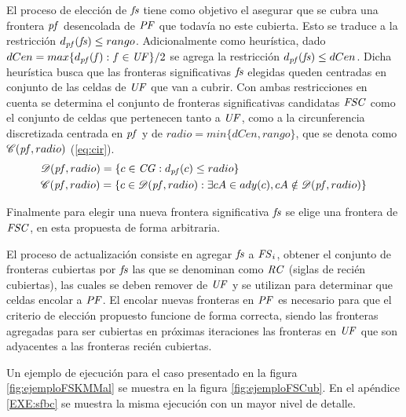 El proceso de elección de $\mathit{fs}$ tiene como objetivo el asegurar que se
cubra una frontera $\mathit{pf}$ desencolada de $\mathit{PF}$ que todavía no este
cubierta. Esto se traduce a la restricción $d_{\mathit{pf}}(\mathit{fs}) \leq rango$.
Adicionalmente como heurística, dado $dCen = max\{ d_{\mathit{pf}}(\mathit{f}) :
f\in\mathit{UF} \}/2$ se agrega la restricción $d_{\mathit{pf}}(\mathit{fs}) \leq dCen$.
Dicha heurística busca que las fronteras significativas $\mathit{fs}$ elegidas queden
centradas en conjunto de las celdas de $\mathit{UF}$ que van a cubrir. Con ambas
restricciones en cuenta se determina el conjunto de fronteras significativas
candidatas $\mathit{FSC}$ como el conjunto de celdas que pertenecen tanto a $\mathit{UF}$, como 
a la circunferencia discretizada centrada en $\mathit{pf}$ y de $radio = min
\{dCen, rango\}$, que se denota como $\mathscr{C}(\mathit{pf},radio)$
(\ref{eq:cir}).
\begin{equation} \label{eq:cir}
\begin{aligned}
&\mathscr{D}(\mathit{pf},radio) = \{c\in\mathit{CG} : d_{\mathit{pf}}(c) \leq radio\}\\ 
&\mathscr{C}(\mathit{pf},radio) = \{c\in\mathscr{D}(\mathit{pf},radio) : \exists cA \in ady(c), cA \notin \mathscr{D}(\mathit{pf},radio) \}
\end{aligned}
\end{equation}

Finalmente para elegir una nueva frontera significativa $\mathit{fs}$ se elige una
frontera de $\mathit{FSC}$, en esta propuesta de forma arbitraria.

El proceso de actualización consiste en agregar $\mathit{fs}$ a $\mathit{FS}_i$, obtener el
conjunto de fronteras cubiertas por $\mathit{fs}$ las que se denominan como
$\mathit{RC}$ (siglas de recién cubiertas), las cuales se deben remover de
$\mathit{UF}$ y se utilizan para determinar que celdas encolar a $\mathit{PF}$.
El encolar nuevas fronteras en $\mathit{PF}$ es necesario para que el criterio de
elección propuesto funcione de forma correcta, siendo las fronteras agregadas
para ser cubiertas en próximas iteraciones las fronteras en $\mathit{UF}$ que son
adyacentes a las fronteras recién cubiertas.

Un ejemplo de ejecución para el caso presentado en la figura
\ref{fig:ejemploFSKMMal} se muestra en la figura \ref{fig:ejemploFSCub}. En el
apéndice \ref{EXE:sfbc} se muestra la misma ejecución con un mayor nivel de
detalle.

